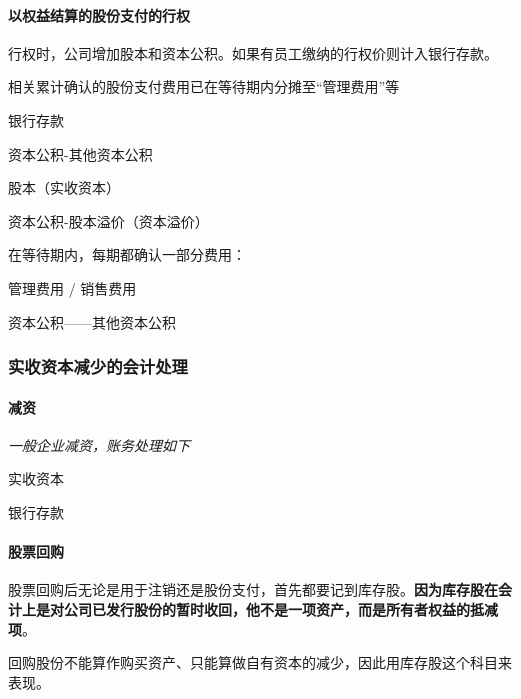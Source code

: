 \documentclass[UTF8,12pt]{ctexart}
\newenvironment{Dr}{%
	\begin{list}{}%
		{
			\setlength{\leftmargin}{2em}
			\setlength{\labelwidth}{2em}
			\setlength{\labelsep}{0pt}
			\setlength{\itemindent}{0pt}
			\setlength{\listparindent}{0pt}
			\setlength{\parsep}{0pt}
			\setlength{\topsep}{0pt}
		}
		\item[\textbf{借：}]
	}{%
	\end{list}
}
\newenvironment{Cr}{%
	\begin{list}{}%
		{
			\setlength{\leftmargin}{3em}
			\setlength{\labelwidth}{2em}
			\setlength{\labelsep}{0pt}
			\setlength{\itemindent}{0pt}
			\setlength{\listparindent}{0pt}
			\setlength{\parsep}{0pt}
			\setlength{\topsep}{0pt}
		}
		\item[\textbf{贷：}]
	}{%
	\end{list}
}
\numberwithin{equation}{section} %
\numberwithin{figure}{section}
\numberwithin{table}{section}
\begin{document}
	\paragraph{以权益结算的股份支付的行权}
	
	行权时，公司增加股本和资本公积。如果有员工缴纳的行权价则计入银行存款。
	
	相关累计确认的股份支付费用已在等待期内分摊至“管理费用”等
	
	\begin{Dr}
		银行存款
		
		资本公积-其他资本公积
	\end{Dr}
	\begin{Cr}
		股本（实收资本）
		
		资本公积-股本溢价（资本溢价）
	\end{Cr}
	
	在等待期内，每期都确认一部分费用：
	
	\begin{Dr}
		管理费用 / 销售费用
	\end{Dr}
	\begin{Cr}
		资本公积——其他资本公积
	\end{Cr}

	
	\subsubsection{实收资本减少的会计处理}
	
	\paragraph{减资}
	
	\textit{一般企业减资，账务处理如下}
	
	\begin{Dr}
		实收资本
	\end{Dr}
	\begin{Cr}
		银行存款
	\end{Cr}
	
	\paragraph{股票回购}
	
	股票回购后无论是用于注销还是股份支付，首先都要记到库存股。\textbf{因为库存股在会计上是对公司已发行股份的暂时收回，他不是一项资产，而是所有者权益的抵减项}。
	
	回购股份不能算作购买资产、只能算做自有资本的减少，因此用库存股这个科目来表现。
	
\end{document}
